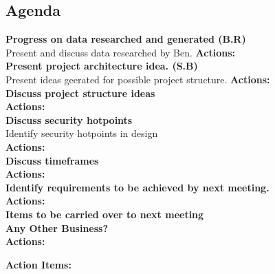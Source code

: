 \documentclass[a4wide,10pt]{extarticle}
\begin{document}
{\subsection*{Agenda}
{\large \textbf{Progress on data researched and generated (B.R)\\}}
Present and discuss data researched by Ben.
\textbf{Actions:\\}
\hfill \break
\hfill \break
\hfill \break
\hfill \break
{\large \textbf{Present project architecture idea. (S.B)\\}}
Present ideas geerated for possible project structure.
\textbf{Actions:\\}
\hfill \break
\hfill \break
\hfill \break
\hfill \break
{\large \textbf{Discuss project structure ideas\\}}
\textbf{Actions:\\}
\hfill \break
\hfill \break
{\large \textbf{Discuss security hotpoints\\}}
Identify security hotpoints in design\\
\textbf{Actions:\\}
\hfill \break
\hfill \break
\hfill \break
\hfill \break
{\large \textbf{Discuss timeframes\\}}
\textbf{Actions:\\}
\hfill \break
\hfill \break
\hfill \break
\hfill \break
{\large \textbf{Identify requirements to be achieved by next meeting.\\}}
\textbf{Actions:\\}
\hfill \break
\hfill \break
\hfill \break
\hfill \break
{\large \textbf{Items to be carried over to next meeting\\}}
\hfill \break
\hfill \break
\hfill \break
\hfill \break
\hfill \break
{\large \textbf{Any Other Business?\\}}
\textbf{Actions:\\}
\hfill \break
\hfill \break
\hfill \break
\hfill \break
\hfill \break

{\large \textbf{Action Items:\\}}
\hfill \break
\hfill \break
\hfill \break
\hfill \break
\hfill \break



\subsection*{\color{red}{Next Meeting: Thursday March 10th}}

}
\end{document}
